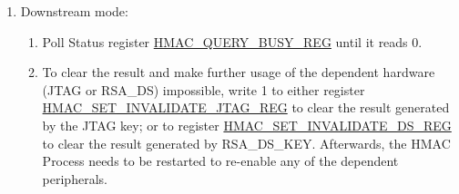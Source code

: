 \documentclass[main\_\_EN.tex]{subfiles}
\begin{document}
\begin{enumerate}
    \item Downstream mode:
    \begin{enumerate}
        \item Poll Status register \hyperref[regdesc:HMACQUERYBUSYREG]{HMAC\_QUERY\_BUSY\_REG} until it reads 0.
        \item
        To clear the result and make further usage of the dependent hardware (JTAG or RSA\_DS) impossible, write 1 to either register \hyperref[regdesc:HMACSETINVALIDATEJTAGREG]{HMAC\_SET\_INVALIDATE\_JTAG\_REG} to clear the result generated by the JTAG key; or to register \hyperref[regdesc:HMACSETINVALIDATEDSREG]{HMAC\_SET\_INVALIDATE\_DS\_REG} to clear the result generated by RSA\_DS\_KEY. Afterwards, the HMAC Process needs to be restarted to re-enable any of the dependent peripherals.
    \end{enumerate}


\end{enumerate}
\end{document}
